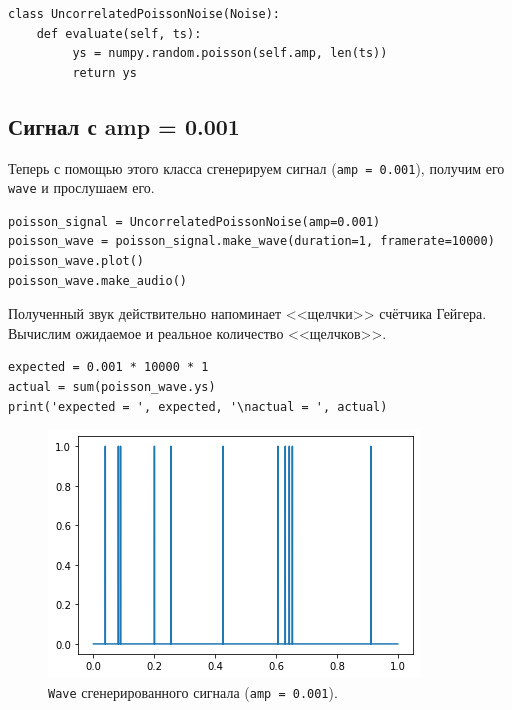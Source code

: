 \documentclass[a4paper, 14pt]{extarticle}
\begin{document}
    \begin{lstlisting}[caption= Класс \texttt{UncorrelatedPoissonNoise}., label={lst:task4_class}]
class UncorrelatedPoissonNoise(Noise):
    def evaluate(self, ts):
         ys = numpy.random.poisson(self.amp, len(ts))
         return ys  \end{lstlisting}

    \subsection{Сигнал с amp = 0.001}
    \label{subsec:task4_small}

    Теперь с помощью этого класса сгенерируем сигнал (\texttt{amp = 0.001}), получим его \texttt{wave} и прослушаем его.

    \begin{lstlisting}[caption= Генерация сигнала с \texttt{amp = 0.001}., label={lst:task4_small_signal}]
poisson_signal = UncorrelatedPoissonNoise(amp=0.001)
poisson_wave = poisson_signal.make_wave(duration=1, framerate=10000)
poisson_wave.plot()
poisson_wave.make_audio()   \end{lstlisting}

    Полученный звук действительно напоминает <<щелчки>> счётчика Гейгера. Вычислим ожидаемое и реальное количество
    <<щелчков>>.

    \begin{lstlisting}[caption= Проверка количества частиц \texttt{(amp = 0.001)}., label={lst:task4_small_check}]
expected = 0.001 * 10000 * 1
actual = sum(poisson_wave.ys)
print('expected = ', expected, '\nactual = ', actual)\end{lstlisting}

    \begin{figure}[H]
        \centering
        \includegraphics[width=0.8\linewidth]{resources/Images/task4_small_wave}
        \caption{\texttt{Wave} сгенерированного сигнала (\texttt{amp = 0.001}).}
        \label{fig:task4_small_wave}
    \end{figure}
\end{document}

